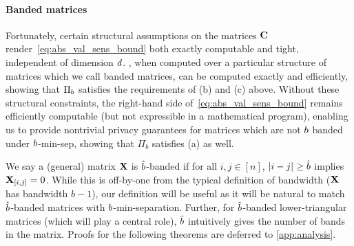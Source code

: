 \documentclass{article}
\begin{document}
\paragraph{Banded matrices} Fortunately, certain structural assumptions on the matrices $\mathbf{C}$ render~\cref{eq:abs_val_sens_bound} both exactly computable and tight, independent of dimension $d$. \bparticipation, when computed over a particular structure of matrices which we call banded matrices, can be computed exactly and efficiently, showing that $\Pi_{b}$ satisfies the requirements of (b) and (c) above. Without these structural constraints, the right-hand side of~\cref{eq:abs_val_sens_bound} remains efficiently computable (but not expressible in a mathematical program), enabling us to provide nontrivial privacy guarantees for matrices which are not $b$ banded under $b$-min-sep, showing that $\Pi_b$ satisfies (a) as well.

We say a (general) matrix $\mathbf{X}$ is $\hat{b}$-banded if for all $i,j \in [n]$, $|i -j| \ge \hat{b}$ implies $\mathbf{X}_{[i, j]} = 0$. While this is off-by-one from the typical definition of bandwidth ($\mathbf{X}$ has bandwidth $b-1$), our definition will be useful as it will be natural to match $\hat{b}$-banded matrices with $b$-min-separation. Further, for $\hat{b}$-banded lower-triangular matrices (which will play a central role), $\hat{b}$ intuitively gives the number of bands in the matrix.  Proofs for the following theorems are deferred to \cref{app:analysis}.


\end{document}
